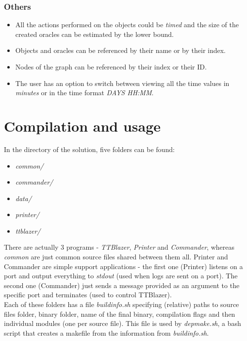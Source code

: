 	\subsubsection{Others}
		\begin{itemize}
			\item All the actions performed on the objects could be \textit{timed} and the size of the created oracles can be estimated by the lower bound.
			\item Objects and oracles can be referenced by their name or by their index.
			\item Nodes of the graph can be referenced by their index or their ID.
			\item The user has an option to switch between viewing all the time values in \textit{minutes} or in the time format \textit{DAYS HH:MM}.
		\end{itemize}		
		
\section{Compilation and usage}

	In the directory of the solution, five folders can be found:
	\begin{itemize}
		\item \textit{common/}
		\item \textit{commander/}
		\item \textit{data/}
		\item \textit{printer/}
		\item \textit{ttblazer/}
	\end{itemize}
	\hspace*{\fill}
	
	There are actually 3 programs - \textit{TTBlazer}, \textit{Printer} and \textit{Commander}, whereas \textit{common} are just common source files shared between them all. Printer and Commander are simple support applications - the first one (Printer) listens on a port and output everything to \textit{stdout} (used when logs are sent on a port). The second one (Commander) just sends a message provided as an argument to the specific port and terminates (used to control TTBlazer). \\
	
	Each of these folders has a file \textit{buildinfo.sh} specifying (relative) paths to source files folder, binary folder, name of the final binary, compilation flags and then individual modules (one per source file). This file is used by \textit{depmake.sh}, a bash script that creates a makefile from the information from \textit{buildinfo.sh}. \\
	
